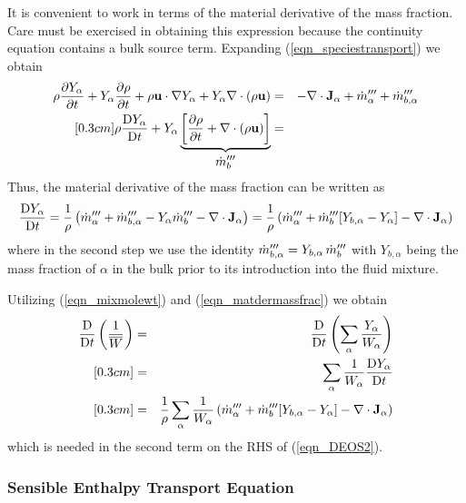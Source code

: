 It is convenient to work in terms of the material derivative of the mass fraction.  Care must be exercised in obtaining this expression because the continuity equation contains a bulk source term.
Expanding (\ref{eqn_speciestransport}) we obtain
\begin{eqnarray}
\label{eqn_speciesexpansion}
\rho\frac{\partial Y_\alpha}{\partial t} + Y_\alpha \frac{\partial \rho}{\partial t} + \rho \mathbf{u}\cdot \nabla Y_\alpha + Y_\alpha \nabla\cdot \left(\rho \mathbf{u}\right) &=&
- \nabla\cdot \mathbf{J}_{\alpha} + \dot{m}_\alpha^{{\prime\prime\prime}} + \dot{m}_{b,\alpha}^{{\prime\prime\prime}} \nonumber\\ [0.3cm]
\rho \frac{\mbox{D} Y_\alpha}{\mbox{D} t} + Y_\alpha \underbrace{\left[ \frac{\partial \rho}{\partial t} + \nabla\cdot \left(\rho \mathbf{u}\right) \right]}_{\displaystyle \dot{m}_b^{{\prime\prime\prime}}} &=& \mbox{}
\end{eqnarray}
Thus, the material derivative of the mass fraction can be written as
\begin{equation}
\label{eqn_matdermassfrac}
\frac{\mbox{D} Y_\alpha}{\mbox{D} t} = \frac{1}{\rho}\left(  \dot{m}_\alpha^{{\prime\prime\prime}} + \dot{m}_{b,\alpha}^{{\prime\prime\prime}} -
Y_\alpha \dot{m}_b^{{\prime\prime\prime}}  - \nabla\cdot \mathbf{J}_{\alpha} \right)
= \frac{1}{\rho}\left(  \dot{m}_\alpha^{{\prime\prime\prime}} + \dot{m}_{b}^{{\prime\prime\prime}}[Y_{b,\alpha} - Y_\alpha] - \nabla\cdot \mathbf{J}_{\alpha} \right)
\end{equation}
where in the second step we use the identity $\dot{m}_{b,\alpha}^{{\prime\prime\prime}} = Y_{b,\alpha}\,\dot{m}_{b}^{{\prime\prime\prime}}$ with $Y_{b,\alpha}$ being the mass fraction of $\alpha$ in the bulk prior to its introduction into the fluid mixture.

Utilizing (\ref{eqn_mixmolewt}) and (\ref{eqn_matdermassfrac}) we obtain
\begin{eqnarray}
\label{eqn_transportexpression}
\frac{\mbox{D}}{\mbox{D} t}\left(\frac{1}{\overline{W}}\right) &=& \frac{\mbox{D}}{\mbox{D} t}\left(\sum_\alpha \frac{Y_\alpha}{W_\alpha} \right) \nonumber\\ [0.3cm]
&=& \sum_\alpha \frac{1}{W_\alpha} \frac{\mbox{D}Y_\alpha }{\mbox{D} t} \nonumber\\ [0.3cm]
&=& \frac{1}{\rho} \sum_\alpha \frac{1}{W_\alpha} \left(  \dot{m}_\alpha^{{\prime\prime\prime}} + \dot{m}_{b}^{{\prime\prime\prime}}[Y_{b,\alpha} - Y_\alpha] - \nabla\cdot \mathbf{J}_{\alpha} \right)
\end{eqnarray}
which is needed in the second term on the RHS of (\ref{eqn_DEOS2}).


\subsubsection{Sensible Enthalpy Transport Equation}
\label{enthalpy_definitions}

